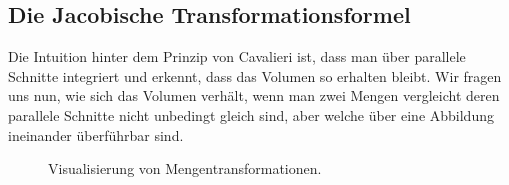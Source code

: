 \documentclass[letterpaper,10pt,german]{jupyterBook}
\let\sphinxpxdimen\pdfpxdimen\else\newdimen\sphinxpxdimen
\begin{document}
\subsection{Die Jacobische Transformationsformel}
\label{\detokenize{masstheorie/integrationstechnik:die-jacobische-transformationsformel}}
\sphinxAtStartPar
Die Intuition hinter dem Prinzip von Cavalieri ist, dass man über parallele Schnitte integriert und erkennt, dass das Volumen so erhalten bleibt. Wir fragen uns nun, wie sich das Volumen verhält, wenn man zwei Mengen vergleicht deren parallele Schnitte nicht unbedingt gleich sind, aber welche über eine Abbildung ineinander überführbar sind.

\begin{figure}[htbp]
\centering
\capstart

\noindent\sphinxincludegraphics[width=600\sphinxpxdimen]{{trafo}.jpg}
\caption{Visualisierung von Mengentransformationen.}\label{\detokenize{masstheorie/integrationstechnik:fig-trafo}}\end{figure}
\end{document}
